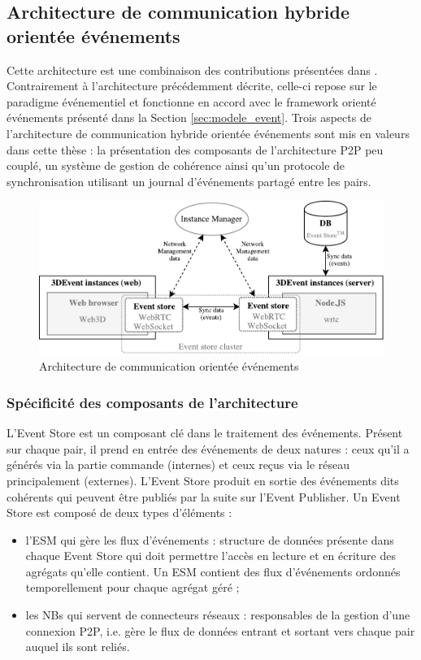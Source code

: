 \subsection{Architecture de communication hybride \og orientée 
événements\fg{}}
\label{sec:comm_event}

Cette architecture est une combinaison des contributions présentées dans 
\cite{Desprat2016,Desprat2017}. Contrairement à l'architecture précédemment 
décrite, celle-ci repose sur le paradigme événementiel et fonctionne en accord 
avec le framework orienté événements présenté dans la Section 
\ref{sec:modele_event}. Trois aspects de l'architecture de communication hybride 
orientée événements sont mis en valeurs dans cette thèse : la présentation des 
composants de l'architecture \gls{P2P} peu couplé, un système de gestion de 
cohérence ainsi qu'un protocole de 
synchronisation utilisant un journal d'événements partagé entre les pairs.
 
\begin{figure}[ht]
	\centering
	\includegraphics[width=\columnwidth]{eps/archi.pdf}
	\caption{Architecture de communication \og orientée événements\fg{}}
	\label{fig:archievent}
\end{figure}

\subsubsection{Spécificité des composants de l'architecture}
L'Event Store est un composant clé dans le traitement des événements. Présent 
sur chaque pair, il prend en entrée des événements de deux natures : ceux qu'il a 
générés via la partie commande (internes) et ceux reçus via le réseau 
principalement (externes). 
L'Event Store produit en sortie des événements dits \og 
cohérents\fg{} qui peuvent être publiés par la suite sur l'Event Publisher.
Un Event Store est composé de deux types d'éléments : 
\begin{itemize}
	\item l'\gls{ESM} qui gère les flux d'événements : structure de données 
	présente dans chaque Event Store qui doit permettre l'accès en lecture et en 
	écriture des agrégats qu'elle contient. 
	Un \gls{ESM} contient des flux d'événements ordonnés temporellement 
	pour chaque agrégat géré ;
	\item les \glspl{NB} qui servent de connecteurs réseaux : responsables de la 
	gestion d'une connexion \gls{P2P}, i.e. gère le flux de données entrant et 
	sortant vers chaque pair auquel ils sont reliés.
\end{itemize}


